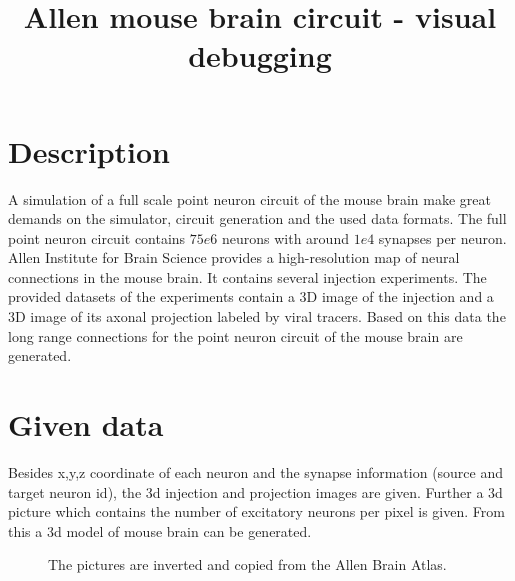 \documentclass[a4paper]{article}
\title{ Allen mouse brain circuit - visual debugging }
\begin{document}
   \maketitle
   
   \section{Description}
   A simulation of a full scale point neuron circuit of the mouse brain make great demands on the simulator, circuit generation and the used data formats.
   The full point neuron circuit contains $75e6$ neurons with around $1e4$ synapses per neuron.     
   Allen Institute for Brain Science provides a high-resolution map of neural connections in the mouse brain.
   It contains several injection experiments. The provided datasets of the experiments 
   contain a 3D image of the injection and a 3D image of its axonal projection labeled by viral
   tracers. Based on this data the long range connections for the point neuron circuit of the mouse brain are generated.   
   
   \section{Given data}
   Besides x,y,z coordinate of each neuron and the synapse information (source and target neuron id), the 3d injection and projection images are given.
   Further a 3d picture which contains the number of excitatory neurons per pixel is given. From this a 3d model of mouse brain can be generated.  
   
   \begin{figure}[ht!]
   	\begin{center}
        \hspace{1cm}
    	   \end{center}
    	\caption{%
        The pictures are inverted and copied from the Allen Brain Atlas.
     }%
   \label{fig:atlas}
   \end{figure}
   
\end{document}
